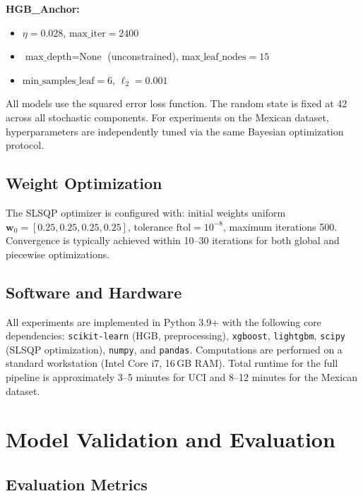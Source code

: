 \documentclass[journal]{IEEEtran}
\begin{document}
\noindent\textbf{HGB\_Anchor:}
\begin{itemize}
\setlength{\itemsep}{0pt}
\item $\eta = 0.028$, $\text{max\_iter} = 2400$
\item $\text{max\_depth} = \text{None}$ (unconstrained), $\text{max\_leaf\_nodes} = 15$
\item $\text{min\_samples\_leaf} = 6$, $\ell_2 = 0.001$
\end{itemize}

All models use the squared error loss function. The random state is fixed at 42 across all stochastic components. For experiments on the Mexican dataset, hyperparameters are independently tuned via the same Bayesian optimization protocol.

\subsection{Weight Optimization}

The SLSQP optimizer is configured with: initial weights uniform $\mathbf{w}_0 = [0.25, 0.25, 0.25, 0.25]$, tolerance $\text{ftol} = 10^{-8}$, maximum iterations 500. Convergence is typically achieved within 10--30 iterations for both global and piecewise optimizations.

\subsection{Software and Hardware}

All experiments are implemented in Python 3.9+ with the following core dependencies: \texttt{scikit-learn} (HGB, preprocessing), \texttt{xgboost}, \texttt{lightgbm}, \texttt{scipy} (SLSQP optimization), \texttt{numpy}, and \texttt{pandas}. Computations are performed on a standard workstation (Intel Core i7, 16\,GB RAM). Total runtime for the full pipeline is approximately 3--5 minutes for UCI and 8--12 minutes for the Mexican dataset.

\section{Model Validation and Evaluation}

\subsection{Evaluation Metrics}
\end{document}
